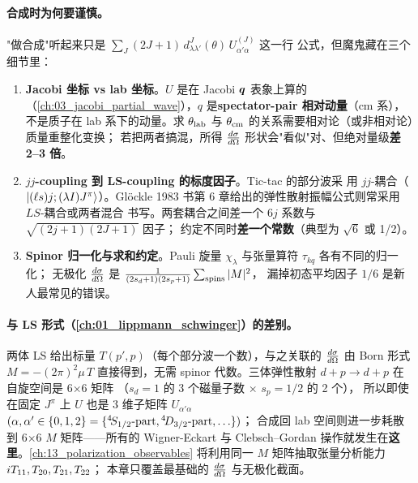 \paragraph{合成时为何要谨慎。}
"做合成"听起来只是
\(\sum_J (2J+1)\,d^J_{\lambda \lambda'}(\theta)\,U_{\alpha' \alpha}^{(J)}\) 这一行
公式，但魔鬼藏在三个细节里：
\begin{enumerate}[leftmargin=2em]
  \item \textbf{Jacobi 坐标 vs lab 坐标}。\(U\) 是在 Jacobi $\bm{q}$ 表象上算的
        （\cref{ch:03_jacobi_partial_wave}），\(q\) 是\textbf{spectator-pair
        相对动量}（cm 系），不是质子在 lab 系下的动量。求 \(\theta_{\rm lab}\)
        与 \(\theta_{\rm cm}\) 的关系需要相对论（或非相对论）质量重整化变换；
        若把两者搞混，所得 \(\frac{d\sigma}{d\Omega}\) 形状会"看似"对、但绝对量级\textbf{差
        2--3 倍}。
  \item \textbf{$jj$-coupling 到 LS-coupling 的标度因子}。Tic-tac 的部分波采
        用 $jj$-耦合（\(\ket{(\ell s) j; (\lambda I) J^\pi}\)）。Glöckle 1983
        书第 6 章给出的弹性散射振幅公式则常采用 \(LS\)-耦合或两者混合
        书写。两套耦合之间差一个 6\(j\) 系数与 \(\sqrt{(2j+1)(2J+1)}\) 因子；
        约定不同时\textbf{差一个常数}（典型为 \(\sqrt{6}\) 或 1/2）。
  \item \textbf{Spinor 归一化与求和约定}。Pauli 旋量
        \(\chi_{\lambda}\) 与张量算符 \(\tau_{kq}\) 各有不同的归一化；
        无极化 \(\frac{d\sigma}{d\Omega}\) 是
        \(\frac{1}{(2s_d+1)(2s_p+1)} \sum_{\rm spins} |M|^2\)，
        漏掉初态平均因子 \(1/6\) 是新人最常见的错误。
\end{enumerate}

\paragraph{与 LS 形式（\cref{ch:01_lippmann_schwinger}）的差别。}
两体 LS 给出标量 \(T(p', p)\)（每个部分波一个数），与之关联的
\(\frac{d\sigma}{d\Omega}\) 由 Born 形式 \(M = -(2\pi)^2 \mu \, T\) 直接得到，无需 spinor
代数。三体弹性散射 \(d + p \to d + p\) 在自旋空间是 6×6 矩阵
（\(s_d = 1\) 的 3 个磁量子数 \(\times\) \(s_p = 1/2\) 的 2 个），
所以即使在固定 \(J^\pi\) 上 \(U\) 也是 3 维子矩阵 \(U_{\alpha' \alpha}\)
\((\alpha,\alpha' \in \{0, 1, 2\} = \{{}^{4}\!S_{1/2}\text{-part}, {}^{4}\!D_{3/2}\text{-part}, \ldots\})\)；
合成回 lab 空间则进一步耗散到 6×6 \(M\) 矩阵——所有的 Wigner-Eckart 与
Clebsch--Gordan 操作就发生在\textbf{这里}。\cref{ch:13_polarization_observables}
将利用同一 \(M\) 矩阵抽取张量分析能力 \({i T_{11}}, {T_{20}}, {T_{21}}, {T_{22}}\)；
本章只覆盖最基础的 \(\frac{d\sigma}{d\Omega}\) 与无极化截面。


